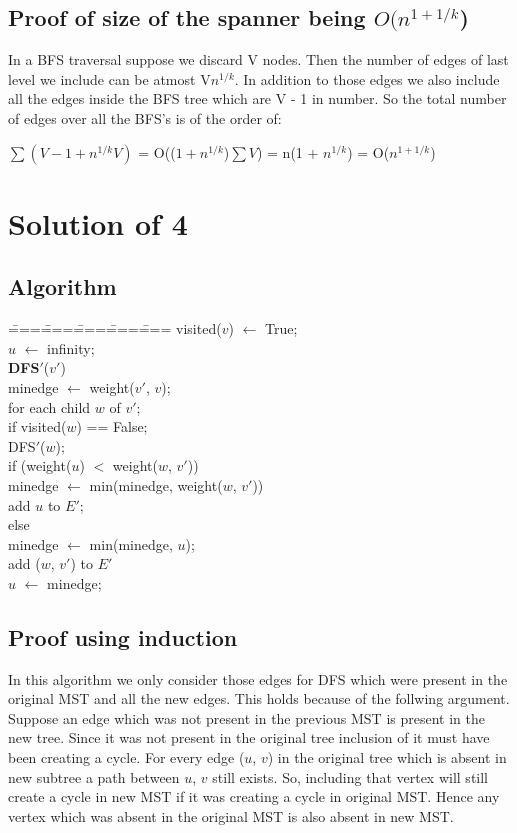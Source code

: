 \documentclass[a4paper,10pt]{article}
\begin{document}
\subsection{Proof of size of the spanner being $O(n^{1 + 1/k}$)}
In a BFS traversal suppose we discard V nodes. Then the number of edges of last level we include can be atmost V$n^{1/k}$.
In addition to those edges we also include all the edges inside the BFS tree which are V - 1 in number. So the total number
of edges over all the BFS's is of the order of:
\begin{center}
 $\displaystyle\sum{(V - 1 + n^{1/k}V)}$ = O(($1 + n^{1/k}$)$\displaystyle\sum{V}$) = n(1 + $n^{1/k}$) = O($n^{1 + 1/k}$)
\end{center}

\section{Solution of 4}
\subsection{Algorithm}
\begin{tabbing}
\====\====\====\====\====\kill
 visited($v$) $\leftarrow$ True;\\
 $u$ $\leftarrow$ infinity;\\
 {\bf DFS$'$}($v'$)\\
 \>\>minedge $\leftarrow$ weight($v'$, $v$);\\
 \>\>for each child $w$ of $v'$;\\
 \>\>\>if visited($w$) == False;\\
 \>\>\>\>DFS$'$($w$);\\
 \>\>\>\>if (weight($u$) $<$ weight($w$, $v'$))\\
 \>\>\>\>\>minedge $\leftarrow$ min(minedge, weight($w$, $v'$))\\
 \>\>\>\>\>add $u$ to $E'$;\\
 \>\>\>\>else\\
 \>\>\>\>\>minedge $\leftarrow$ min(minedge, $u$);\\
 \>\>\>\>\>add ($w$, $v'$) to $E'$\\
 \>\>$u$ $\leftarrow$ minedge;\\
\end{tabbing}
\subsection{Proof using induction}
In this algorithm we only consider those edges for DFS which were present in the original MST and all the new
edges. This holds because of the follwing argument. Suppose an edge which was not present in the previous MST
is present in the new tree. Since it was not present in the original tree inclusion of it must have been creating
a cycle. For every edge ($u$, $v$) in the original tree which is absent in new subtree a path between $u$, $v$ still
exists. So, including that vertex will still create a cycle in new MST if it was creating a cycle in original MST.
Hence any vertex which was absent in the original MST is also absent in new MST.
\end{document}
